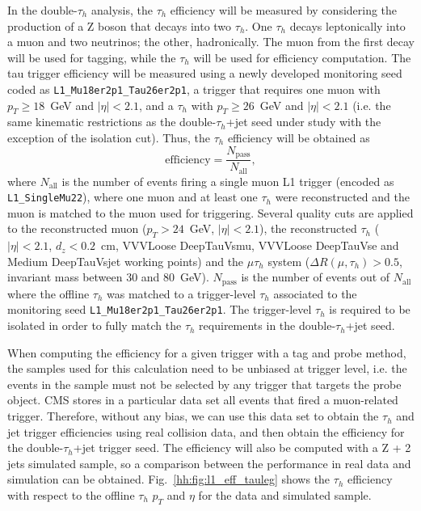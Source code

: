 \documentclass[../main.tex]{subfiles}
\begin{document}
In the double-$\tau_h$ analysis, the $\tau_h$ efficiency will be measured by considering the production of a Z boson that decays into two $\tau_h$. One $\tau_h$ decays leptonically into a muon and two neutrinos; the other, hadronically. The muon from the first decay will be used for tagging, while the $\tau_h$ will be used for efficiency computation. The tau trigger efficiency will be measured using a newly developed monitoring seed coded as \texttt{L1\_Mu18er2p1\_Tau26er2p1}, a trigger that requires one muon with $p_T\geq18$~GeV and $|\eta|<2.1$, and a $\tau_h$ with $p_T\geq26$~GeV and $|\eta|<2.1$ (i.e. the same kinematic restrictions as the double-$\tau_h$+jet seed under study with the exception of the isolation cut). Thus, the $\tau_h$ efficiency will be obtained as
\begin{equation}
\text{efficiency} = \frac{N_\text{pass}}{N_\text{all}},
\end{equation}
where $N_\text{all}$ is the number of events firing a single muon L1 trigger (encoded as \texttt{L1\_SingleMu22}), where one muon and at least one $\tau_h$ were reconstructed and the muon is matched to the muon used for triggering. Several quality cuts are applied to the reconstructed muon ($p_T>24$~GeV, $|\eta|<2.1$), the reconstructed $\tau_h$ ($|\eta|<2.1$, $d_z<0.2$~cm, VVVLoose DeepTauVsmu, VVVLoose DeepTauVse and Medium DeepTauVsjet working points) and the $\mu\tau_h$ system ($\Delta R(\mu, \tau_h) > 0.5$, invariant mass between 30 and 80~GeV). $N_\text{pass}$ is the number of events out of $N_\text{all}$ where the offline $\tau_h$ was matched to a trigger-level $\tau_h$ associated to the monitoring seed \texttt{L1\_Mu18er2p1\_Tau26er2p1}. The trigger-level $\tau_h$ is required to be isolated in order to fully match the $\tau_h$ requirements in the double-$\tau_h$+jet seed. 

When computing the efficiency for a given trigger with a tag and probe method, the samples used for this calculation need to be unbiased at trigger level, i.e. the events in the sample must not be selected by any trigger that targets the probe object. CMS stores in a particular data set all events that fired a muon-related trigger. Therefore, without any bias, we can use this data set to obtain the $\tau_h$ and jet trigger efficiencies using real collision data, and then obtain the efficiency for the double-$\tau_h$+jet trigger seed. The efficiency will also be computed with a Z + 2 jets simulated sample, so a comparison between the performance in real data and simulation can be obtained. Fig.~\ref{hh:fig:l1_eff_tauleg} shows the $\tau_h$ efficiency with respect to the offline $\tau_h$ $p_T$ and $\eta$ for the data and simulated sample.
\end{document}
